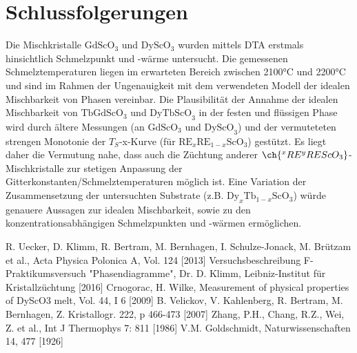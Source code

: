 \documentclass[aps,twocolumn,secnumarabic,nobalancelastpage,amsmath,amssymb,
nofootinbib,superscriptaddress]{revtex4-1}
\begin{document}

\section{Schlussfolgerungen}

\noindent Die Mischkristalle $\text{Gd}\text{ScO}_3$ und $\text{Dy}\text{ScO}_3$ wurden mittels DTA erstmals hinsichtlich Schmelzpunkt und -wärme untersucht. Die gemessenen Schmelztemperaturen liegen im erwarteten Bereich zwischen 2100°C und 2200°C und
sind im Rahmen der Ungenauigkeit mit dem verwendeten Modell der idealen Mischbarkeit von Phasen vereinbar. Die Plausibilität der Annahme der idealen Mischbarkeit von $\text{TbGdScO}_3$ und $\text{DyTbScO}_3$ in der
festen und flüssigen Phase wird durch ältere Messungen (an $\text{GdScO}_3$ und $\text{DyScO}_3$) und der vermuteteten strengen Monotonie der $T_S$-x-Kurve (für $\text{RE}_{x}\text{RE}_{1-x}\text{ScO}_3$) gestützt.
Es liegt daher die Vermutung nahe, dass auch die Züchtung anderer $\ch{^{x}RE^{y}REScO_3}$-Mischkristalle zur stetigen Anpassung der Gitterkonstanten/Schmelztemperaturen möglich ist.
Eine Variation der Zusammensetzung der untersuchten Substrate (z.B. $\text{Dy}_{x}\text{Tb}_{1-x}\text{ScO}_3$) würde genauere Aussagen zur idealen Mischbarkeit, sowie zu den konzentrationsabhängigen Schmelzpunkten und -wärmen ermöglichen.




\begin{thebibliography}{99}
R. Uecker, D. Klimm, R. Bertram, M. Bernhagen, I. Schulze-Jonack, M. Brützam et al., Acta Physica Polonica A, Vol. 124 [2013]
Versuchsbeschreibung F-Praktikumsversuch "Phasendiagramme", Dr. D. Klimm, Leibniz-Institut für Kristallzüchtung [2016]
Crnogorac, H. Wilke, Measurement of physical properties of DyScO3 melt, Vol. 44, I 6 [2009]
B. Velickov, V. Kahlenberg, R. Bertram, M. Bernhagen, Z. Kristallogr. 222, p 466-473 [2007]
Zhang, P.H., Chang, R.Z., Wei, Z. et al., Int J Thermophys 7: 811 [1986]
V.M. Goldschmidt, Naturwissenschaften 14, 477 [1926]
\end{thebibliography}
\end{document}
